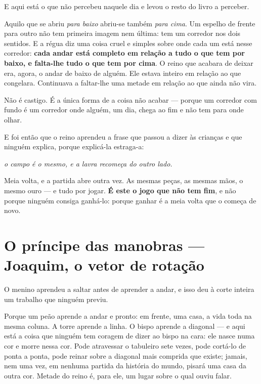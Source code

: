 \documentclass[livro.tex]{subfiles}
\begin{document}
\medskip

E aqui está o que \Ben não percebeu naquele dia e levou o resto do livro a perceber.

Aquilo que se abriu \emph{para baixo} abriu-se também \emph{para cima}. Um espelho de
frente para outro não tem primeira imagem nem última: tem um corredor nos dois sentidos.
E a régua diz uma coisa cruel e simples sobre onde cada um está nesse corredor:
\textbf{cada andar está completo em relação a tudo o que tem por baixo, e falta-lhe tudo o
que tem por cima}. O reino que \Ben acabara de deixar era, agora, o andar de baixo de
alguém. Ele estava inteiro em relação ao que congelara. Continuava a faltar-lhe uma
metade em relação ao que ainda não vira.

Não é castigo. É a única forma de a coisa não acabar --- porque um corredor com fundo é
um corredor onde alguém, um dia, chega ao fim e não tem para onde olhar.

\medskip

E foi então que o reino aprendeu a frase que passou a dizer às crianças e que ninguém
explica, porque explicá-la estraga-a:

\begin{center}\itshape
o campo é o mesmo, e a lavra recomeça do outro lado.
\end{center}

\noindent Meia volta, e a partida abre outra vez. As mesmas peças, as mesmas mãos, o
mesmo ouro --- e tudo por jogar. \textbf{É este o jogo que não tem fim}, e não porque
ninguém consiga ganhá-lo: porque ganhar é a meia volta que o começa de novo.

\chapter{O príncipe das manobras --- Joaquim, o vetor de rotação}

O menino aprendeu a saltar antes de aprender a andar, e isso deu à corte inteira um
trabalho que ninguém previu.

Porque um peão aprende a andar e pronto: em frente, uma casa, a vida toda na mesma
coluna. A torre aprende a linha. O bispo aprende a diagonal --- e aqui está a coisa que
ninguém tem coragem de dizer ao bispo na cara: ele nasce numa cor e morre nessa cor. Pode
atravessar o tabuleiro sete vezes, pode cortá-lo de ponta a ponta, pode reinar sobre a
diagonal mais comprida que existe; jamais, nem uma vez, em nenhuma partida da história do
mundo, pisará uma casa da outra cor. Metade do reino é, para ele, um lugar sobre o qual
ouviu falar.
\end{document}
